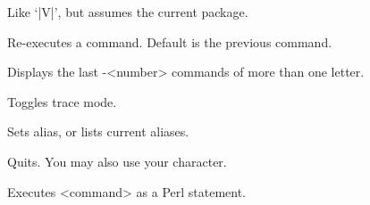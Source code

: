 \documentclass{refbase}
\begin{document}
\begin{enum}{2.5cm}
Like `|V|', but assumes the current package.

\Xi{|!| [ [-]<number> ]}
Re-executes a command. Default is the previous command.

Displays the last -<number> commands of more than one letter.

Toggles trace mode.

Sets alias, or lists current aliases.

Quits. You may also use your  character.

Executes <command> as a Perl statement.

\end{enum}

\newpage

\vfill
{}
\end{document}

